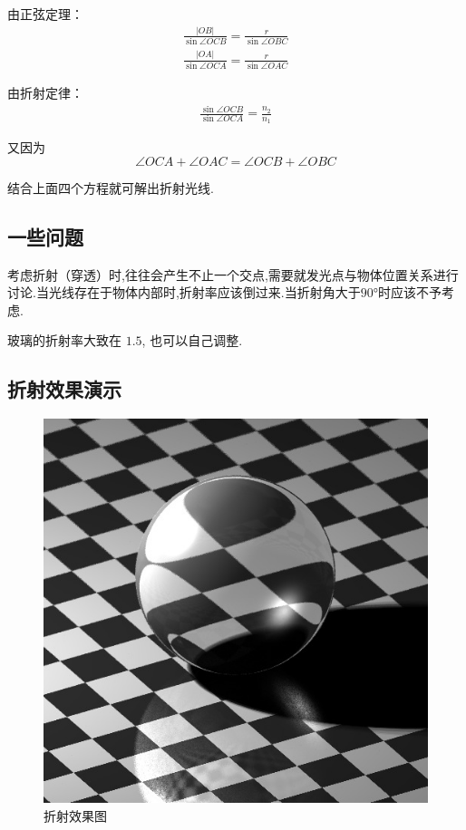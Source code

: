 \documentclass[10pt,twocolumn]{article}
\begin{document}
由正弦定理：
\begin{align}
\frac{|OB|}{\sin{\angle OCB}}=\frac{r}{\sin{\angle OBC}}\\
\frac{|OA|}{\sin{\angle OCA}}=\frac{r}{\sin{\angle OAC}}
\end{align}

由折射定律：
\begin{align}
\frac{\sin{\angle OCB}}{\sin{\angle OCA}}=\frac{n_2}{n_1}
\end{align}

又因为
\begin{equation}
\angle OCA + \angle OAC = \angle OCB + \angle OBC
\end{equation}

结合上面四个方程就可解出折射光线.

\subsection{\hei 一些问题}
考虑折射（穿透）时,往往会产生不止一个交点,需要就发光点与物体位置关系进行讨论.当光线存在于物体内部时,折射率应该倒过来.当折射角大于$90°$时应该不予考虑.

玻璃的折射率大致在 $1.5$, 也可以自己调整.

\newpage

\subsection{\hei 折射效果演示}

\begin{figure}[ht]
\centering
\includegraphics[scale=.4]{fig11.jpg}
\caption{折射效果图}
\end{figure}
\end{document}
